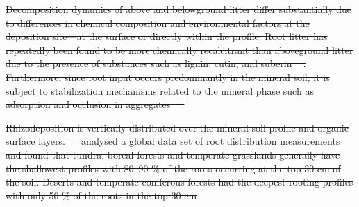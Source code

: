 \documentclass[11pt, oneside, a4paper]{article}   	%
\providecommand{\DIFdeltex}[1]{{\protect\color{red}\sout{#1}}}                      %
\providecommand{\DIFaddbegin}{} %
\providecommand{\DIFdelbegin}{} %
\providecommand{\DIFdelend}{} %
\providecommand{\DIFdel}[1]{\texorpdfstring{\DIFdeltex{#1}}{}} %
\newcommand{\DIFscaledelfig}{0.5}
\newlength{\DIFdelgraphicswidth} %
\newlength{\DIFdelgraphicsheight} %
\newcommand{\DIFaddincludegraphics}[2][]{{\color{blue}\fbox{\DIFOincludegraphics[#1]{#2}}}} %
\newcommand{\DIFdelincludegraphics}[2][]{%
\sbox{\DIFdelgraphicsbox}{\DIFOincludegraphics[#1]{#2}}%
\settoboxwidth{\DIFdelgraphicswidth}{\DIFdelgraphicsbox} %
\settoboxtotalheight{\DIFdelgraphicsheight}{\DIFdelgraphicsbox} %
\scalebox{\DIFscaledelfig}{%
\parbox[b]{\DIFdelgraphicswidth}{\usebox{\DIFdelgraphicsbox}\\[-\baselineskip] \rule{\DIFdelgraphicswidth}{0em}}\llap{\resizebox{\DIFdelgraphicswidth}{\DIFdelgraphicsheight}{%
\setlength{\unitlength}{\DIFdelgraphicswidth}%
\begin{picture}(1,1)%
\thicklines\linethickness{2pt} %
{\color[rgb]{1,0,0}\put(0,0){\framebox(1,1){}}}%
{\color[rgb]{1,0,0}\put(0,0){\line( 1,1){1}}}%
{\color[rgb]{1,0,0}\put(0,1){\line(1,-1){1}}}%
\end{picture}%
}\hspace*{3pt}}} %
} %
\DeclareRobustCommand{\DIFaddbegin}{\DIFOaddbegin \let\includegraphics\DIFaddincludegraphics} %
\DeclareRobustCommand{\DIFdelbegin}{\DIFOdelbegin \let\includegraphics\DIFdelincludegraphics} %
\DeclareRobustCommand{\DIFdelend}{\DIFOaddend \let\includegraphics\DIFOincludegraphics} %
\begin{document}
\DIFdelbegin \DIFdel{Decomposition dynamics of above and belowground litter differ substantially
due to differences in chemical composition and environmental factors at the deposition site—at the surface or directly within the profile. Root litter has repeatedly been
found to be more chemically recalcitrant than aboveground litter due to the presence
of substances such as lignin, cutin, and suberin \mbox{%
\citep{Rasse2005}}\hskip0pt%
. Furthermore,
since root input occurs predominantly in the mineral soil, it is subject to stabilization
mechanisms related to the mineral phase such as adsorption and occlusion in aggregates \mbox{%
\citep{Rasse2005}}\hskip0pt%
. 
}\DIFdelend %

\DIFdelbegin \DIFdel{Rhizodeposition is vertically distributed over the mineral soil profile and organic
surface layers. \mbox{%
\citet{Jackson2000} }\hskip0pt%
analysed a global data set of root distribution
measurements and found that tundra, boreal forests and temperate grasslands generally have the shallowest profiles with 80–90 \% of the roots occurring at the top 30 cm
of the soil. Deserts and temperate coniferous forests had the deepest
rooting profiles with only 50 \% of the roots in the top 30 cm}\DIFdelend %
\DIFaddbegin 
\end{document}
